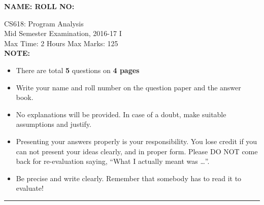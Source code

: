 \documentclass[12pt]{article}
\begin{document}
{\Large\bf NAME: \hspace*{3in} ROLL NO:}

\begin{center}
CS618: Program Analysis \\
Mid Semester Examination, 2016-17 I\\
Max Time: 2 Hours  \hfill Max Marks: 125 \\

{\bf NOTE: }
\begin{itemize}
\item There are total {\bf 5} questions on {\bf 4 pages}
\item Write your name and roll number on the question paper and the
  answer book.
\item No explanations will be provided. In case of a doubt, make
  suitable assumptions and justify.

\item Presenting your answers properly is your
  responsibility. You lose credit if you can not present your
  ideas clearly, and in proper form. Please DO NOT come back
  for re-evaluation saying, ``What I actually meant was
  \ldots''.

\item Be precise and write clearly. Remember that somebody
  has to read it to evaluate!

\end{itemize}
\hrule
\end{center}
\end{document}
